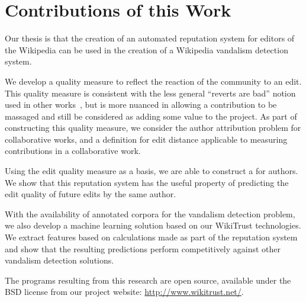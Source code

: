 \section{Contributions of this Work}

Our thesis is that the creation of an automated reputation system
for editors of the Wikipedia can be used in the creation
of a Wikipedia vandalism detection system.

We develop a quality measure to reflect the reaction of
the community to an edit.
This quality measure is consistent with the less general
``reverts are bad'' notion used in other
works~\cite{Smets2008,Itakura2009,Belani2010,West2010},
but is more nuanced in allowing a contribution to be massaged
and still be considered as adding some value to the project.
As part of constructing this quality measure, we consider the
author attribution problem for collaborative works,
and a definition for edit distance applicable to
measuring contributions in a collaborative work.

Using the edit quality measure as a basis, we are able
to construct a  for authors.
We show that this reputation system has the useful property
of predicting the edit quality of future edits by the same
author.

With the availability of annotated corpora for the vandalism
detection problem, we also develop a machine learning solution based on our
WikiTrust technologies.
We extract features based on calculations made as part of the
reputation system and show that the resulting predictions perform
competitively against other vandalism detection solutions.

The programs resulting from this research are open source,
available under the BSD license from our project website:
\url{http://www.wikitrust.net/}.

